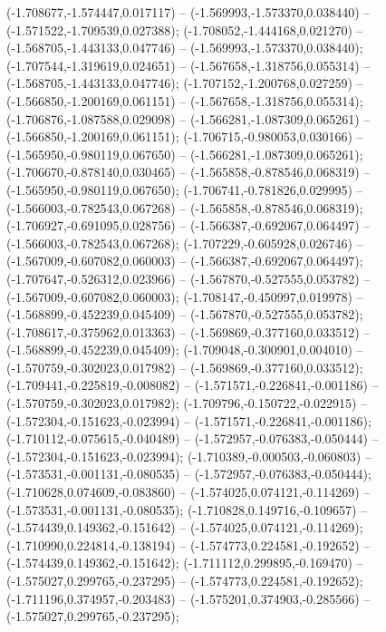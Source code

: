  (-1.708677,-1.574447,0.017117) -- (-1.569993,-1.573370,0.038440) -- (-1.571522,-1.709539,0.027388);
 (-1.708052,-1.444168,0.021270) -- (-1.568705,-1.443133,0.047746) -- (-1.569993,-1.573370,0.038440);
 (-1.707544,-1.319619,0.024651) -- (-1.567658,-1.318756,0.055314) -- (-1.568705,-1.443133,0.047746);
 (-1.707152,-1.200768,0.027259) -- (-1.566850,-1.200169,0.061151) -- (-1.567658,-1.318756,0.055314);
 (-1.706876,-1.087588,0.029098) -- (-1.566281,-1.087309,0.065261) -- (-1.566850,-1.200169,0.061151);
 (-1.706715,-0.980053,0.030166) -- (-1.565950,-0.980119,0.067650) -- (-1.566281,-1.087309,0.065261);
 (-1.706670,-0.878140,0.030465) -- (-1.565858,-0.878546,0.068319) -- (-1.565950,-0.980119,0.067650);
 (-1.706741,-0.781826,0.029995) -- (-1.566003,-0.782543,0.067268) -- (-1.565858,-0.878546,0.068319);
 (-1.706927,-0.691095,0.028756) -- (-1.566387,-0.692067,0.064497) -- (-1.566003,-0.782543,0.067268);
 (-1.707229,-0.605928,0.026746) -- (-1.567009,-0.607082,0.060003) -- (-1.566387,-0.692067,0.064497);
 (-1.707647,-0.526312,0.023966) -- (-1.567870,-0.527555,0.053782) -- (-1.567009,-0.607082,0.060003);
 (-1.708147,-0.450997,0.019978) -- (-1.568899,-0.452239,0.045409) -- (-1.567870,-0.527555,0.053782);
 (-1.708617,-0.375962,0.013363) -- (-1.569869,-0.377160,0.033512) -- (-1.568899,-0.452239,0.045409);
 (-1.709048,-0.300901,0.004010) -- (-1.570759,-0.302023,0.017982) -- (-1.569869,-0.377160,0.033512);
 (-1.709441,-0.225819,-0.008082) -- (-1.571571,-0.226841,-0.001186) -- (-1.570759,-0.302023,0.017982);
 (-1.709796,-0.150722,-0.022915) -- (-1.572304,-0.151623,-0.023994) -- (-1.571571,-0.226841,-0.001186);
 (-1.710112,-0.075615,-0.040489) -- (-1.572957,-0.076383,-0.050444) -- (-1.572304,-0.151623,-0.023994);
 (-1.710389,-0.000503,-0.060803) -- (-1.573531,-0.001131,-0.080535) -- (-1.572957,-0.076383,-0.050444);
 (-1.710628,0.074609,-0.083860) -- (-1.574025,0.074121,-0.114269) -- (-1.573531,-0.001131,-0.080535);
 (-1.710828,0.149716,-0.109657) -- (-1.574439,0.149362,-0.151642) -- (-1.574025,0.074121,-0.114269);
 (-1.710990,0.224814,-0.138194) -- (-1.574773,0.224581,-0.192652) -- (-1.574439,0.149362,-0.151642);
 (-1.711112,0.299895,-0.169470) -- (-1.575027,0.299765,-0.237295) -- (-1.574773,0.224581,-0.192652);
 (-1.711196,0.374957,-0.203483) -- (-1.575201,0.374903,-0.285566) -- (-1.575027,0.299765,-0.237295);
